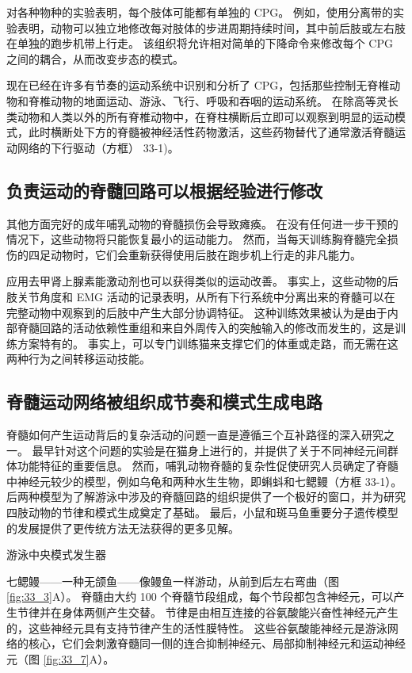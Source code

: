 对各种物种的实验表明，每个肢体可能都有单独的 CPG。
例如，使用分离带的实验表明，动物可以独立地修改每对肢体的步进周期持续时间，其中前后肢或左右肢在单独的跑步机带上行走。
该组织将允许相对简单的下降命令来修改每个 CPG 之间的耦合，从而改变步态的模式。


现在已经在许多有节奏的运动系统中识别和分析了 CPG，包括那些控制无脊椎动物和脊椎动物的地面运动、游泳、飞行、呼吸和吞咽的运动系统。
在除高等灵长类动物和人类以外的所有脊椎动物中，在脊柱横断后立即可以观察到明显的运动模式，此时横断处下方的脊髓被神经活性药物激活，这些药物替代了通常激活脊髓运动网络的下行驱动（方框） 33-1)。


\subsection{负责运动的脊髓回路可以根据经验进行修改}

其他方面完好的成年哺乳动物的脊髓损伤会导致瘫痪。 在没有任何进一步干预的情况下，这些动物将只能恢复最小的运动能力。
然而，当每天训练胸脊髓完全损伤的四足动物时，它们会重新获得使用后肢在跑步机上行走的非凡能力。


应用去甲肾上腺素能激动剂也可以获得类似的运动改善。
事实上，这些动物的后肢关节角度和 EMG 活动的记录表明，从所有下行系统中分离出来的脊髓可以在完整动物中观察到的后肢中产生大部分协调特征。
这种训练效果被认为是由于内部脊髓回路的活动依赖性重组和来自外周传入的突触输入的修改而发生的，这是训练方案特有的。
事实上，可以专门训练猫来支撑它们的体重或走路，而无需在这两种行为之间转移运动技能。




\subsection{脊髓运动网络被组织成节奏和模式生成电路}

脊髓如何产生运动背后的复杂活动的问题一直是遵循三个互补路径的深入研究之一。
最早针对这个问题的实验是在猫身上进行的，并提供了关于不同神经元间群体功能特征的重要信息。
然而，哺乳动物脊髓的复杂性促使研究人员确定了脊髓中神经元较少的模型，例如乌龟和两种水生生物，即蝌蚪和七鳃鳗（方框 33-1）。
后两种模型为了解游泳中涉及的脊髓回路的组织提供了一个极好的窗口，并为研究四肢动物的节律和模式生成奠定了基础。
最后，小鼠和斑马鱼重要分子遗传模型的发展提供了更传统方法无法获得的更多见解。


游泳中央模式发生器

七鳃鳗——一种无颌鱼——像鳗鱼一样游动，从前到后左右弯曲（图 \ref{fig:33_3}A）。
脊髓由大约 100 个脊髓节段组成，每个节段都包含神经元，可以产生节律并在身体两侧产生交替。
节律是由相互连接的谷氨酸能兴奋性神经元产生的，这些神经元具有支持节律产生的活性膜特性。
这些谷氨酸能神经元是游泳网络的核心，它们会刺激脊髓同一侧的连合抑制神经元、局部抑制神经元和运动神经元（图 \ref{fig:33_7}A）。


